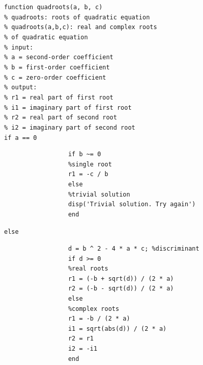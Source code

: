 \documentclass[../main.tex]{subfiles}
\begin{document}
\begin{example}
    \texttt{function quadroots(a, b, c)\\
    \indent \% quadroots: roots of quadratic equation\\
    \indent \% \hspace{2mm}quadroots(a,b,c): real and complex roots\\
    \indent \% \indent\indent of quadratic equation\\
    \indent \% input:\\
    \indent \% \hspace{2mm}a = second-order coefficient\\
    \indent \% \hspace{2mm}b = first-order coefficient\\
    \indent \% \hspace{2mm}c = zero-order coefficient\\
    \indent \% output:\\
    \indent \% \hspace{2mm}r1 = real part of first root\\
    \indent \% \hspace{2mm}i1 = imaginary part of first root\\
    \indent \% \hspace{2mm}r2 = real part of second root\\
    \indent \% \hspace{2mm}i2 = imaginary part of second root\\
    \indent if a == 0}\\

    \begin{figure}[h]
        \begin{lstlisting}[numbers=none]
            %special cases
            if b ~= 0
            %single root
            r1 = -c / b
            else
            %trivial solution
            disp('Trivial solution. Try again')
            end
        \end{lstlisting}
    \end{figure}

    \texttt{else}\\

    \begin{figure}[h]
        \begin{lstlisting}[numbers=none]
            %quadratic formula
            d = b ^ 2 - 4 * a * c; %discriminant
            if d >= 0
            %real roots
            r1 = (-b + sqrt(d)) / (2 * a)
            r2 = (-b - sqrt(d)) / (2 * a)
            else
            %complex roots
            r1 = -b / (2 * a)
            i1 = sqrt(abs(d)) / (2 * a)
            r2 = r1
            i2 = -i1
            end
        \end{lstlisting}
    \end{figure}


\end{example}
\end{document}
